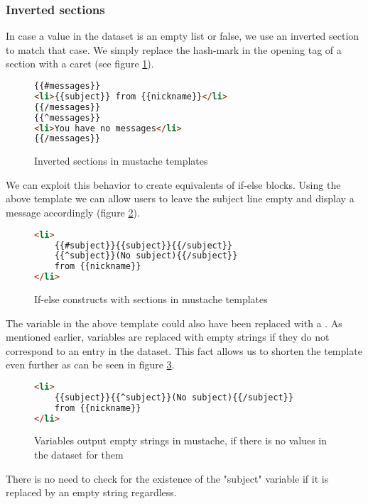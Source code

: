 \documentclass[thesis.tex]{subfiles}
\begin{document}
\subsubsection{Inverted sections}
In case a value in the dataset is an empty list or false, we use an inverted
section to match that case. We simply replace the hash-mark in the opening tag
of a section with a caret (see figure \ref{fig:inverted.mustache}).
\begin{figure}
	\centering
	\caption{Inverted sections in mustache templates}
	\label{fig:inverted.mustache}
	\begin{lstlisting}[language=HTML]
{{#messages}}
<li>{{subject}} from {{nickname}}</li>
{{/messages}}
{{^messages}}
<li>You have no messages</li>
{{/messages}}
	\end{lstlisting}
\end{figure}

We can exploit this behavior to create equivalents of if-else blocks.
Using the above template we can allow users to leave the subject line empty
and display a message accordingly (figure \ref{fig:ifelse.mustache}).
\begin{figure}
	\centering
	\caption{If-else constructs with sections in mustache templates}
	\label{fig:ifelse.mustache}
	\begin{lstlisting}[language=HTML]
<li>
	{{#subject}}{{subject}}{{/subject}}
	{{^subject}}(No subject){{/subject}}
	from {{nickname}}
</li>
	\end{lstlisting}
\end{figure}

The  variable in the above template could also have been
replaced with a . As mentioned earlier, variables are replaced
with empty strings if they do not correspond to an entry in the dataset.
This fact allows us to shorten the template even further as can be seen in
figure \ref{fig:emptystr.mustache}.
\begin{figure}
	\centering
	\caption{Variables output empty strings in mustache, if there is no values in
	         the dataset for them}
	\label{fig:emptystr.mustache}
	\begin{lstlisting}[language=HTML]
<li>
	{{subject}}{{^subject}}(No subject){{/subject}}
	from {{nickname}}
</li>
	\end{lstlisting}
\end{figure}

There is no need to check for the existence of the "subject" variable if it is
replaced by an empty string regardless.
\end{document}
